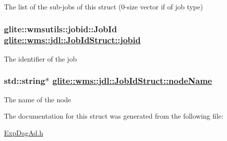 The list of the sub-jobs of this struct (0-size vector if of job type) \hypertarget{structglite_1_1wms_1_1jdl_1_1JobIdStruct_o0}{
\subsubsection[jobid]{\setlength{\rightskip}{0pt plus 5cm}glite::wmsutils::jobid::Job\-Id \hyperlink{structglite_1_1wms_1_1jdl_1_1JobIdStruct_o0}{glite::wms::jdl::Job\-Id\-Struct::jobid}}}
\label{structglite_1_1wms_1_1jdl_1_1JobIdStruct_o0}


The identifier of the job \hypertarget{structglite_1_1wms_1_1jdl_1_1JobIdStruct_o1}{
\subsubsection[nodeName]{\setlength{\rightskip}{0pt plus 5cm}std::string$\ast$ \hyperlink{structglite_1_1wms_1_1jdl_1_1JobIdStruct_o1}{glite::wms::jdl::Job\-Id\-Struct::node\-Name}}}
\label{structglite_1_1wms_1_1jdl_1_1JobIdStruct_o1}


The name of the node 

The documentation for this struct was generated from the following file:\begin{CompactItemize}
\item 
\hyperlink{ExpDagAd_8h}{Exp\-Dag\-Ad.h}\end{CompactItemize}
